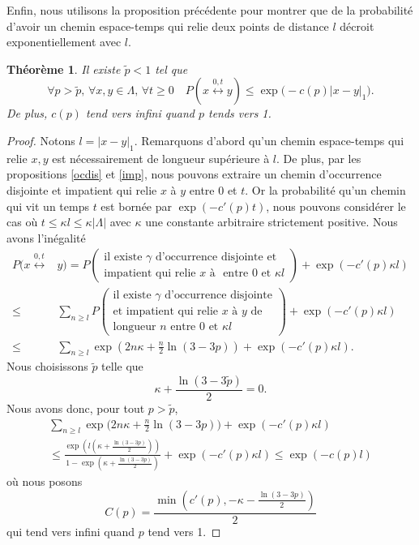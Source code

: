 \documentclass[titlepage,a4paper,12pt]{article}
\newcounter{d}
\newcounter{t}
\newcounter{p}
\newcounter{c}
\newcounter{a}
\newcounter{l}
\newtheorem{thm}[t]{Théorème}
\begin{document}
Enfin, nous utilisons la proposition précédente pour montrer que de la probabilité d'avoir un chemin espace-temps qui relie deux points de distance $l$ décroit exponentiellement avec $l$.
\begin{thm} Il existe $\tilde{p}< 1$ tel que 
$$\forall p > \tilde{p},\, \forall x,y \in \Lambda,\, \forall t \geqslant 0\quad P(x\overset{0,t}{\longleftrightarrow} y)\leqslant \exp\big(-c(p)|x-y|_1\big).
$$ De plus, $c(p)$ tend vers infini quand $p$ tends vers 1.
\end{thm}
\begin{proof}
Notons $l = |x-y|_1$. Remarquons d'abord qu'un chemin espace-temps qui relie $x,y$ est nécessairement de longueur supérieure à $l$. De plus, par les propositions \ref{ocdis} et \ref{imp}, nous pouvons extraire un chemin d'occurrence disjointe et impatient qui relie $x$ à $y$ entre $0$ et $t$. Or la probabilité qu'un chemin qui vit un temps $t$ est bornée par $\exp(-c'(p)t)$, nous pouvons considérer le cas où $t\leqslant \kappa l \leqslant \kappa |\Lambda|$ avec $\kappa$ une constante arbitraire strictement positive.  Nous avons l'inégalité
\begin{align*}
P(x\overset{0,t}{\longleftrightarrow}& y)=P\left(\begin{array}{c} \text{il existe }\gamma \text{ d'occurrence disjointe et}\\\text{impatient qui relie } x\text{ à }\text{ entre }0\text{ et }\kappa l\end{array}\right) + \exp(-c'(p)\kappa l)\\
\leqslant& \sum_{n\geqslant l}P\left(\begin{array}{c} \text{il existe }\gamma \text{ d'occurrence disjointe}\\\text{et impatient qui relie } x\text{ à }y\text{ de}\\ \text{longueur }n\text{ entre }0\text{ et }\kappa l\end{array}\right) + \exp(-c'(p)\kappa l)\\
\leqslant& \sum_{n\geqslant l} \exp\left(2n\kappa+\frac{n}{2}\ln(3-3p)\right) + \exp(-c'(p)\kappa l).
\end{align*}
Nous choisissons $\tilde{p}$ telle que $$\kappa+\frac{\ln(3-3\tilde{p})}{2} = 0.$$ Nous avons donc, pour tout $p>\tilde{p}$,
\begin{multline*} \sum_{n\geqslant l} \exp\big(2n\kappa+\frac{n}{2}\ln(3-3p)\big) + \exp(-c'(p)\kappa l) \\
\leqslant \frac{\exp(l(\kappa+\frac{\ln(3-3p)}{2}))}{1-\exp(\kappa+\frac{\ln(3-3p)}{2})}+\exp(-c'(p)\kappa l)\leqslant \exp(-c(p)l)
\end{multline*}
où nous posons $$C(p) = \frac{\min(c'(p),-\kappa-\frac{\ln(3-3p)}{2})}{2}$$ qui tend vers infini quand $p$ tend vers 1.
\end{proof}
\end{document}
